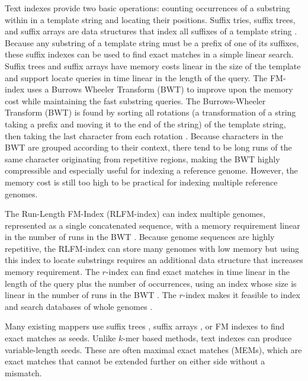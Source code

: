 \documentclass[11pt]{ucscthesis}
\begin{document}
Text indexes provide two basic operations: counting occurrences of a substring within in a template string and locating their positions.
Suffix tries, suffix trees, and suffix arrays are data structures that index all suffixes of a template string \cite{li_survey_2010}.
Because any substring of a template string must be a prefix of one of its suffixes, these suffix indexes can be used to find exact matches in a simple linear search.
Suffix trees and suffix arrays have memory costs linear in the size of the template and support locate queries in time linear in the length of the query.
The FM-index uses a Burrows Wheeler Transform (BWT) to improve upon the memory cost while maintaining the fast substring queries.
The Burrows-Wheeler Transform (BWT) is found by sorting all rotations (a transformation of a string taking a prefix and moving it to the end of the string) of the template string, then taking the last character from each rotation \cite{burrows_wheeler_1994}.
Because characters in the BWT are grouped according to their context, there tend to be long runs of the same character originating from repetitive regions, making the BWT highly compressible and especially useful for indexing a reference genome.
However, the memory cost is still too high to be practical for indexing multiple reference genomes.

The Run-Length FM-Index (RLFM-index) can index multiple genomes, represented as a single concatenated sequence, with a memory requirement linear in the number of runs in the BWT \cite{makinen_succinct_2005,makinen_storage_2010}.
Because genome sequences are highly repetitive, the RLFM-index can store many genomes with low memory but using this index to locate substrings requires an additional data structure that increases memory requirement.
The $r$-index can find exact matches in time linear in the length of the query plus the number of occurrences, using an index whose size is linear in the number of runs in the BWT \cite{gagie_rindex_2020}.
The $r$-index makes it feasible to index and search databases of whole genomes \cite{rossi_moni_2022}.

Many existing mappers use suffix trees \cite{kurtz_versatile_2004}, suffix arrays \cite{abouelhoda_replacing_2004,hoffmann_fast_2009}, or FM indexes \cite{langmead_bowtie2_2012,li_bwa_mem_2013,li_soap2_2009,li_bwa_2009,langmead_bowtie_2009} to find exact matches as seeds.
Unlike $k$-mer based methods, text indexes can produce variable-length seeds.
These are often maximal exact matches (MEMs), which are exact matches that cannot be extended further on either side without a mismatch.
\end{document}
